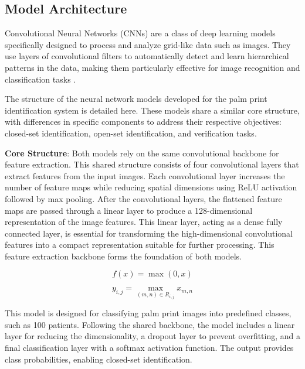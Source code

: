 \begin{enumerate}
\end{enumerate}

\subsection{Model Architecture}
Convolutional Neural Networks (CNNs) are a class of deep learning models specifically designed to process and analyze grid-like data such as images. They use layers of convolutional filters to automatically detect and learn hierarchical patterns in the data, making them particularly effective for image recognition and classification tasks \cite{726791}.

The structure of the neural network models developed for the palm print identification system is detailed here. These models share a similar core structure, with differences in specific components to address their respective objectives: closed-set identification, open-set identification, and verification tasks.

\textbf{Core Structure}: Both models rely on the same convolutional backbone for feature extraction. This shared structure consists of four convolutional layers that extract features from the input images. Each convolutional layer increases the number of feature maps while reducing spatial dimensions using ReLU activation followed by max pooling. After the convolutional layers, the flattened feature maps are passed through a linear layer to produce a 128-dimensional representation of the image features. This linear layer, acting as a dense fully connected layer, is essential for transforming the high-dimensional convolutional features into a compact representation suitable for further processing. This feature extraction backbone forms the foundation of both models.

\begin{equation}
    f(x) = \max(0, x)
    \label{eq:relu}
\end{equation}

\begin{equation}
    y_{i,j} = \max_{(m,n) \in R_{i,j}} x_{m,n}
    \label{eq:maxpool}
\end{equation}

This model is designed for classifying palm print images into predefined classes, such as 100 patients. Following the shared backbone, the model includes a linear layer for reducing the dimensionality, a dropout layer to prevent overfitting, and a final classification layer with a softmax activation function. The output provides class probabilities, enabling closed-set identification.

